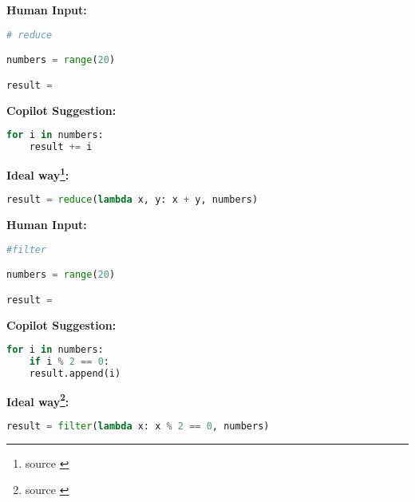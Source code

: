 \begin{tcolorbox}[title=Reduce,boxsep=.5mm]
\textbf{Human Input:}
\begin{lstlisting}[language=Python]
# reduce

numbers = range(20)

result =
\end{lstlisting}
\tcbline
\textbf{Copilot Suggestion:}
\begin{lstlisting}[language=Python,escapechar=\%]
% \noindent\textcolor{gray}{result = 0} % []
for i in numbers:
    result += i
\end{lstlisting}
\tcbline
\textbf{Ideal way\footnote{source \cite{Alexandru2018}}:}
\begin{lstlisting}[language=Python]
result = reduce(lambda x, y: x + y, numbers)
\end{lstlisting}
\end{tcolorbox}


\begin{tcolorbox}[title=Filter,boxsep=.5mm]
\textbf{Human Input:}
\begin{lstlisting}[language=Python]
#filter

numbers = range(20)

result =
\end{lstlisting}
\tcbline
\textbf{Copilot Suggestion:}
\begin{lstlisting}[language=Python,escapechar=\%]
% \noindent\textcolor{gray}{result = []} % []
for i in numbers:
    if i % 2 == 0:
	result.append(i)
\end{lstlisting}
\tcbline
\textbf{Ideal way\footnote{source \cite{Alexandru2018}}:}
\begin{lstlisting}[language=Python]
result = filter(lambda x: x % 2 == 0, numbers)
\end{lstlisting}
\end{tcolorbox}